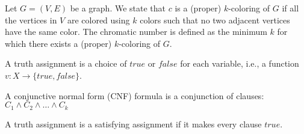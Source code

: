\begin{definition}
Let $G = (V, E)$ be a graph. We state that $c$ is a (proper) $k$-coloring of $G$ if all the vertices in $V$ are colored using $k$ colors such that no two adjacent vertices have the same color. The chromatic number is defined as the minimum $k$ for which there exists a (proper) $k$-coloring of $G$.
\end{definition}

\begin{definition}
A truth assignment is a choice of $\mathit{true}$ or $\mathit{false}$ for each variable, i.e., a function $v : X \rightarrow \{true, false\}$.
\end{definition}

\begin{definition}
A conjunctive normal form (CNF) formula is a conjunction of clauses:
$C_1 \wedge C_2 \wedge \ldots \wedge C_k$
\end{definition}

\begin{definition}
A truth assignment is a satisfying assignment if it makes every clause $true$.
\end{definition}

%


